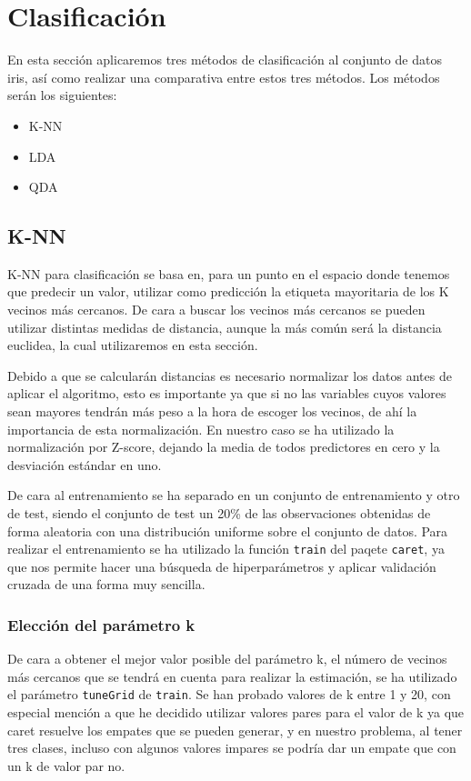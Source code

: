 \section{Clasificación}

En esta sección aplicaremos tres métodos de clasificación al conjunto de datos iris, así como realizar una comparativa entre estos tres métodos. Los métodos serán los siguientes:

\begin{itemize}
	\item K-NN
	\item LDA
	\item QDA
\end{itemize}

\subsection{K-NN}

K-NN para clasificación se basa en, para un punto en el espacio donde tenemos que predecir un valor, utilizar como predicción la etiqueta mayoritaria de los K vecinos más cercanos. De cara a buscar los vecinos más cercanos se pueden utilizar distintas medidas de distancia, aunque la más común será la distancia euclidea, la cual utilizaremos en esta sección.

Debido a que se calcularán distancias es necesario normalizar los datos antes de aplicar el algoritmo, esto es importante ya que si no las variables cuyos valores sean mayores tendrán más peso a la hora de escoger los vecinos, de ahí la importancia de esta normalización. En nuestro caso se ha utilizado la normalización por Z-score, dejando la media de todos predictores en cero y la desviación estándar en uno.

De cara al entrenamiento se ha separado en un conjunto de entrenamiento y otro de test, siendo el conjunto de test un 20\% de las observaciones obtenidas de forma aleatoria con una distribución uniforme sobre el conjunto de datos. Para realizar el entrenamiento se ha utilizado la función \texttt{train} del paqete \texttt{caret}, ya que nos permite hacer una búsqueda de hiperparámetros y aplicar validación cruzada de una forma muy sencilla.

\subsubsection{Elección del parámetro k}

De cara a obtener el mejor valor posible del parámetro k, el número de vecinos más cercanos que se tendrá en cuenta para realizar la estimación, se ha utilizado el parámetro \texttt{tuneGrid} de \texttt{train}. Se han probado valores de k entre 1 y 20, con especial mención a que he decidido utilizar valores pares para el valor de k ya que caret resuelve los empates que se pueden generar, y en nuestro problema, al tener tres clases, incluso con algunos valores impares se podría dar un empate que con un k de valor par no.

